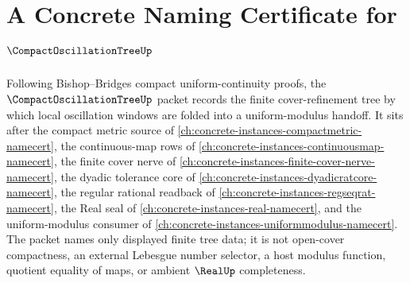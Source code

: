 \chapter{A Concrete Naming Certificate for $\CompactOscillationTreeUp$}
\label{ch:concrete-instances-compact-oscillation-tree-namecert}

Following Bishop--Bridges compact uniform-continuity proofs, the $\CompactOscillationTreeUp$ packet records the finite cover-refinement tree by which local oscillation windows are folded into a uniform-modulus handoff. It sits after the compact metric source of \autoref{ch:concrete-instances-compactmetric-namecert}, the continuous-map rows of \autoref{ch:concrete-instances-continuousmap-namecert}, the finite cover nerve of \autoref{ch:concrete-instances-finite-cover-nerve-namecert}, the dyadic tolerance core of \autoref{ch:concrete-instances-dyadicratcore-namecert}, the regular rational readback of \autoref{ch:concrete-instances-regseqrat-namecert}, the Real seal of \autoref{ch:concrete-instances-real-namecert}, and the uniform-modulus consumer of \autoref{ch:concrete-instances-uniformmodulus-namecert}. The packet names only displayed finite tree data; it is not open-cover compactness, an external Lebesgue number selector, a host modulus function, quotient equality of maps, or ambient $\RealUp$ completeness.

